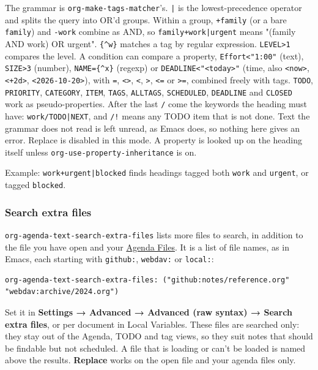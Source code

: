 \documentclass[11pt]{article}
\begin{document}
The grammar is \texttt{org-make-tags-matcher}'s. \texttt{|} is the lowest-precedence operator and splits the query into OR'd groups. Within a group, \texttt{+family} (or a bare \texttt{family}) and \texttt{-work} combine as AND, so \texttt{family+work|urgent} means "(family AND work) OR urgent". \texttt{\{\textasciicircum{}w\}} matches a tag by regular expression. \texttt{LEVEL>1} compares the level. A condition can compare a property, \texttt{Effort<"1:00"} (text), \texttt{SIZE>3} (number), \texttt{NAME=\{\textasciicircum{}x\}} (regexp) or \texttt{DEADLINE<"<today>"} (time, also \texttt{<now>}, \texttt{<+2d>}, \texttt{<2026-10-20>}), with \texttt{=}, \texttt{<>}, \texttt{<}, \texttt{>}, \texttt{<=} or \texttt{>=}, combined freely with tags. \texttt{TODO}, \texttt{PRIORITY}, \texttt{CATEGORY}, \texttt{ITEM}, \texttt{TAGS}, \texttt{ALLTAGS}, \texttt{SCHEDULED}, \texttt{DEADLINE} and \texttt{CLOSED} work as pseudo-properties. After the last \texttt{/} come the keywords the heading must have: \texttt{work/TODO|NEXT}, and \texttt{/!} means any TODO item that is not done. Text the grammar does not read is left unread, as Emacs does, so nothing here gives an error. Replace is disabled in this mode. A property is looked up on the heading itself unless \texttt{org-use-property-inheritance} is on.

Example: \texttt{work+urgent|blocked} finds headings tagged both \texttt{work} and \texttt{urgent}, or tagged \texttt{blocked}.

\subsubsection{Search extra files}
\label{sec:org67b7b15}
\texttt{org-agenda-text-search-extra-files} lists more files to search, in addition to the file you have open and your \hyperref[sec:org4d24003]{Agenda Files}. It is a list of file names, as in Emacs, each starting with \texttt{github:}, \texttt{webdav:} or \texttt{local:}:

\begin{verbatim}
org-agenda-text-search-extra-files: ("github:notes/reference.org" "webdav:archive/2024.org")
\end{verbatim}

Set it in \textbf{Settings → Advanced → Advanced (raw syntax) → Search extra files}, or per document in Local Variables. These files are searched only: they stay out of the Agenda, TODO and tag views, so they suit notes that should be findable but not scheduled. A file that is loading or can't be loaded is named above the results. \textbf{Replace} works on the open file and your agenda files only.
\end{document}
